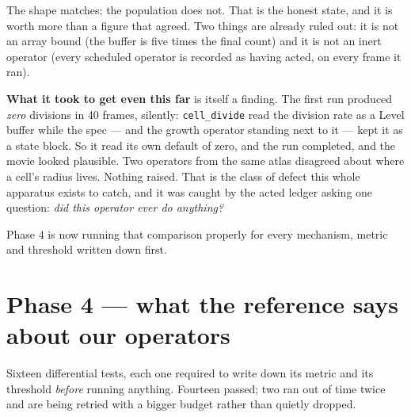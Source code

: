 \documentclass[11pt,a4paper]{article}
\newcommand{\code}[1]{\texttt{#1}}
\begin{document}
The shape matches; the population does not. That is the honest state, and it is worth more than a
figure that agreed. Two things are already ruled out: it is not an array bound (the buffer is five
times the final count) and it is not an inert operator (every scheduled operator is recorded as
having acted, on every frame it ran).

\textbf{What it took to get even this far} is itself a finding. The first run produced
\emph{zero} divisions in 40 frames, silently: \code{cell\_divide} read the division rate as a
Level buffer while the spec --- and the growth operator standing next to it --- kept it as a state
block. So it read its own default of zero, and the run completed, and the movie looked plausible.
Two operators from the same atlas disagreed about where a cell's radius lives. Nothing raised.
That is the class of defect this whole apparatus exists to catch, and it was caught by the acted
ledger asking one question: \emph{did this operator ever do anything?}

Phase 4 is now running that comparison properly for every mechanism, metric and threshold written
down first.

\section{Phase 4 --- what the reference says about our operators}\label{sec:p4}

Sixteen differential tests, each one required to write down its metric and its threshold
\emph{before} running anything. Fourteen passed; two ran out of time twice and are being retried
with a bigger budget rather than quietly dropped.
\end{document}
